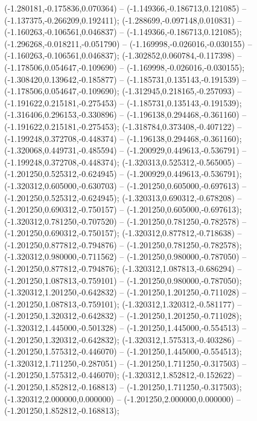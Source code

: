  (-1.280181,-0.175836,0.070364) -- (-1.149366,-0.186713,0.121085) -- (-1.137375,-0.266209,0.192411);
 (-1.288699,-0.097148,0.010831) -- (-1.160263,-0.106561,0.046837) -- (-1.149366,-0.186713,0.121085);
 (-1.296268,-0.018211,-0.051790) -- (-1.169998,-0.026016,-0.030155) -- (-1.160263,-0.106561,0.046837);
 (-1.302852,0.060784,-0.117398) -- (-1.178506,0.054647,-0.109690) -- (-1.169998,-0.026016,-0.030155);
 (-1.308420,0.139642,-0.185877) -- (-1.185731,0.135143,-0.191539) -- (-1.178506,0.054647,-0.109690);
 (-1.312945,0.218165,-0.257093) -- (-1.191622,0.215181,-0.275453) -- (-1.185731,0.135143,-0.191539);
 (-1.316406,0.296153,-0.330896) -- (-1.196138,0.294468,-0.361160) -- (-1.191622,0.215181,-0.275453);
 (-1.318784,0.373408,-0.407122) -- (-1.199248,0.372708,-0.448374) -- (-1.196138,0.294468,-0.361160);
 (-1.320068,0.449731,-0.485594) -- (-1.200929,0.449613,-0.536791) -- (-1.199248,0.372708,-0.448374);
 (-1.320313,0.525312,-0.565005) -- (-1.201250,0.525312,-0.624945) -- (-1.200929,0.449613,-0.536791);
 (-1.320312,0.605000,-0.630703) -- (-1.201250,0.605000,-0.697613) -- (-1.201250,0.525312,-0.624945);
 (-1.320313,0.690312,-0.678208) -- (-1.201250,0.690312,-0.750157) -- (-1.201250,0.605000,-0.697613);
 (-1.320312,0.781250,-0.707520) -- (-1.201250,0.781250,-0.782578) -- (-1.201250,0.690312,-0.750157);
 (-1.320312,0.877812,-0.718638) -- (-1.201250,0.877812,-0.794876) -- (-1.201250,0.781250,-0.782578);
 (-1.320312,0.980000,-0.711562) -- (-1.201250,0.980000,-0.787050) -- (-1.201250,0.877812,-0.794876);
 (-1.320312,1.087813,-0.686294) -- (-1.201250,1.087813,-0.759101) -- (-1.201250,0.980000,-0.787050);
 (-1.320312,1.201250,-0.642832) -- (-1.201250,1.201250,-0.711028) -- (-1.201250,1.087813,-0.759101);
 (-1.320312,1.320312,-0.581177) -- (-1.201250,1.320312,-0.642832) -- (-1.201250,1.201250,-0.711028);
 (-1.320312,1.445000,-0.501328) -- (-1.201250,1.445000,-0.554513) -- (-1.201250,1.320312,-0.642832);
 (-1.320312,1.575313,-0.403286) -- (-1.201250,1.575312,-0.446070) -- (-1.201250,1.445000,-0.554513);
 (-1.320312,1.711250,-0.287051) -- (-1.201250,1.711250,-0.317503) -- (-1.201250,1.575312,-0.446070);
 (-1.320312,1.852812,-0.152622) -- (-1.201250,1.852812,-0.168813) -- (-1.201250,1.711250,-0.317503);
 (-1.320312,2.000000,0.000000) -- (-1.201250,2.000000,0.000000) -- (-1.201250,1.852812,-0.168813);
